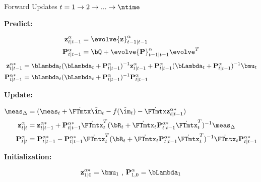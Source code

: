 \begin{algorithm}[t]
	\caption{Forward Updates {\footnotesize $t = 1 \rightarrow 2 \rightarrow ... \rightarrow \ntime$ } \label{alg:forward} }
	
	{\bf Predict:}
	
	{ \footnotesize
		\begin{align}
		\notag {\bf z}^{\alpha}_{t|t-1} &= \evolve {\bf z}^{\alpha}_{t-1|t-1} \\
		\notag {\bf P}^{\alpha}_{t|t-1} &= \bQ  + \evolve {\bf P}^{\alpha}_{t-1|t-1} \evolve^T
		\end{align}
		\begin{align}
		\notag {\bf z}^{\alpha*}_{t|t-1} &= \bLambda_t ( \bLambda_t + {\bf P}^{\alpha}_{t|t-1} )^{-1} {\bf z}^{\alpha}_{t|t-1} + {\bf P}^{\alpha}_{t|t-1} ( \bLambda_t + {\bf P}^{\alpha}_{t|t-1} )^{-1} \bmu_t \\
		\notag {\bf P}^{\alpha*}_{t|t-1} & = \bLambda_t ( \bLambda_t + {\bf P}^{\alpha}_{t|t-1} )^{-1} {\bf P}^{\alpha}_{t|t-1} 
		\end{align}
	}
	
	{\bf Update:}
	
	{\footnotesize
		\begin{align}
		\notag \meas_\Delta &= (  \meas_t + \dot{\FTmtx} \tilde{\im}_t - f(\tilde{\im}_t) -  \dot{\FTmtx} {\bf z}^{\alpha*}_{t|t-1} ) \\
		\notag {\bf z}^{\alpha}_{t|t} &  =  {\bf z}^{\alpha*}_{t|t-1}  + {\bf P}^{\alpha*}_{t|t-1} \dot{\FTmtx}_t^T ( \bR_t +  \dot{\FTmtx}_t {\bf P}^{\alpha*}_{t|t-1} \dot{\FTmtx}_t^T )^{-1} \meas_\Delta  \\
		\notag {\bf P}^{\alpha}_{t|t} & = {\bf P}^{\alpha*}_{t|t-1} - {\bf P}^{\alpha*}_{t|t-1}\dot{\FTmtx}_t^T ( \bR_t + \dot{\FTmtx}_t {\bf P}^{\alpha*}_{t|t-1} \dot{\FTmtx}_t^T )^{-1} \dot{\FTmtx}_t {\bf P}^{\alpha*}_{t|t-1} 
		\end{align}
	}
	
	
	{\bf Initialization:}
	
	{\footnotesize
		\begin{align}
		\notag {\bf z}^{\alpha*}_{1|0} = \bmu_1 \mbox{   ,   } {\bf P}^{\alpha}_{1,0}   = \bLambda_1
		\end{align}
	}
	
	
\end{algorithm}


